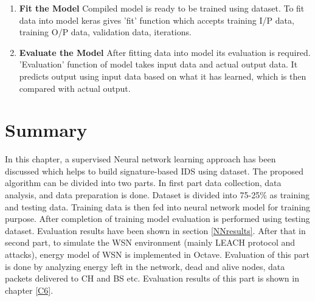 \begin{enumerate}[label=\textbf{\roman*}.]
\item \textbf{Fit the Model } Compiled model is ready to be trained using dataset. To fit data into model keras gives 'fit' function which accepts training I/P data, training O/P data, validation data, iterations.

\item \textbf{Evaluate the Model } After fitting data into model its evaluation is required. 'Evaluation' function of model takes input data and actual output data. It predicts output using input data based on what it has learned, which is then compared with actual output. 

\end{enumerate}    

        
\section{Summary} \label{SSummary}
In this chapter, a supervised Neural network learning approach has been discussed which helps to build signature-based IDS using dataset. The proposed algorithm can be divided into two parts. In first part data collection, data analysis, and data preparation is done. Dataset is divided into 75-25\% as training and testing data.  Training data is then fed into neural network model for training purpose. After completion of training model evaluation is performed using testing dataset. Evaluation results have been shown in section \ref{NNresults}.
After that in second part, to simulate the WSN environment (mainly LEACH protocol and attacks), energy model of WSN is implemented in Octave. Evaluation of this part is done by analyzing energy left in the network, dead and alive nodes, data packets delivered to CH and BS etc. Evaluation results of this part is shown in chapter \ref{C6}.
 